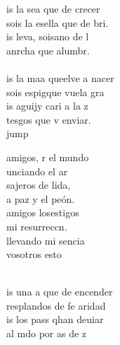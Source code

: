 \begin{cancion}[Id y enseñad][Garabaín]%
	is la sea que de crecer\\
	sois la esella que de bri.\\
	is leva, soisano de l\\
	anrcha que  alumbr.\\
	\jump\\
	is la maa queelve a nacer\\
	sois espigque vuela gra\\
	is aguijy cari a la z\\
	tesgos que v enviar.\\jump\\
	\begin{chorus}%
	amigos, r el mundo\\
	unciando el ar\\
	sajeros de lida,\\
	a paz y el peón.\\
	amigos losestigos\\
	 mi resurreccn. \\
	llevando mi sencia\\
	vosotros esto\\
	\end{chorus}%
	\jump\\
	is una a que de encender\\
	resplandos de fe aridad\\
	is los pass qhan deuiar\\
	al mdo por as de z\\
	\jump\\

\end{cancion}
